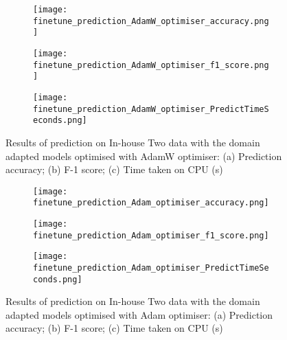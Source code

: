 \documentclass[a4paper,12pt]{article}
\newcommand{\figwidthhh}{0.45\textwidth}
\newcommand{\inghamTwo}{In-house Two\xspace}  %
\begin{document}
\begin{figure}[h!]
	\begin{center}
		\begin{subfigure}[b]{\figwidthhh}
			\caption{} 
			\texttt{[image: finetune\_prediction\_AdamW\_optimiser\_accuracy.png]}
		\end{subfigure}
        \hfill
		\begin{subfigure}[b]{\figwidthhh}
			\caption{}
			\texttt{[image: finetune\_prediction\_AdamW\_optimiser\_f1\_score.png]}
		\end{subfigure}
        \hfill
		\begin{subfigure}[b]{\figwidthhh}
			\caption{}
			\texttt{[image: finetune\_prediction\_AdamW\_optimiser\_PredictTimeSeconds.png]}
		\end{subfigure}
	\end{center}
	\caption{Results of prediction on \inghamTwo data with the domain adapted models optimised with AdamW optimiser: (a) Prediction accuracy; (b) F-1 score; (c) Time taken on CPU (s)
	} 
\end{figure}

\begin{figure}[h!]
	\begin{center}
		\begin{subfigure}[b]{\figwidthhh}
			\caption{} 
			\texttt{[image: finetune\_prediction\_Adam\_optimiser\_accuracy.png]}
		\end{subfigure}
        \hfill
		\begin{subfigure}[b]{\figwidthhh}
			\caption{}
			\texttt{[image: finetune\_prediction\_Adam\_optimiser\_f1\_score.png]}
		\end{subfigure}
        \hfill
		\begin{subfigure}[b]{\figwidthhh}
			\caption{}
			\texttt{[image: finetune\_prediction\_Adam\_optimiser\_PredictTimeSeconds.png]}
		\end{subfigure}
	\end{center}
	\caption{Results of prediction on \inghamTwo data with the domain adapted models optimised with Adam optimiser: (a) Prediction accuracy; (b) F-1 score; (c) Time taken on CPU (s)
	} 
\end{figure}
\end{document}
